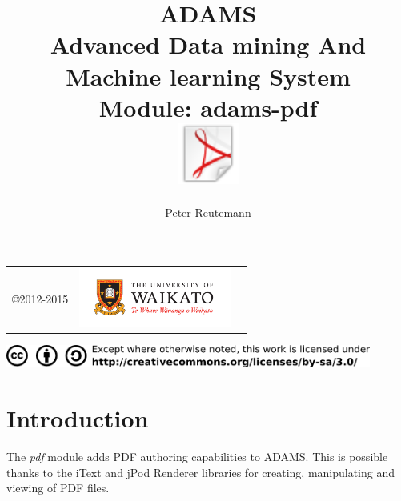 \documentclass[a4paper]{book}
\title{
  \textbf{ADAMS} \\
  {\Large \textbf{A}dvanced \textbf{D}ata mining \textbf{A}nd \textbf{M}achine
  learning \textbf{S}ystem} \\
  {\Large Module: adams-pdf} \\
  \vspace{1cm}
  \includegraphics[width=2cm]{images/pdf-module.png} \\
}
\author{
  Peter Reutemann
}
\begin{document}
\begin{titlepage}
\maketitle

\thispagestyle{empty}
\center
\begin{table}[b]
	\begin{tabular}{c l l}
		\parbox[c][2cm]{2cm}{\copyright 2012-2015} &
		\parbox[c][2cm]{5cm}{\includegraphics[width=5cm]{images/coat_of_arms.pdf}} \\
	\end{tabular}
	\includegraphics[width=12cm]{images/cc.png} \\
\end{table}

\end{titlepage}

\tableofcontents
\listoffigures

\chapter{Introduction}
The \textit{pdf} module adds PDF authoring capabilities to ADAMS. 
This is possible thanks to the iText \cite{itext} and jPod Renderer \cite{jpod} 
libraries for creating, manipulating and viewing of PDF files.

\end{document}
